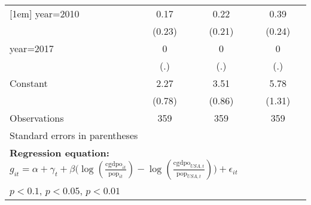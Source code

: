 \begin{sidewaystable}[htbp]
\begin{tabular}{l*{3}{c}}
[1em]
year=2010       &     0.17         &     0.22         &     0.39         \\
                &   (0.23)         &   (0.21)         &   (0.24)         \\
[1em]
year=2017       &        0         &        0         &        0         \\
                &      (.)         &      (.)         &      (.)         \\
[1em]
Constant        &     2.27\sym{***}&     3.51\sym{***}&     5.78\sym{***}\\
                &   (0.78)         &   (0.86)         &   (1.31)         \\
\hline
Observations    &      359         &      359         &      359         \\
\hline\hline
\multicolumn{4}{l}{\footnotesize Standard errors in parentheses}\\
\multicolumn{4}{l}{\footnotesize \textbf{Regression equation:} \(g_{it} = \alpha + \gamma_t + \beta \big(\log (\frac{\textrm{cgdpo}_{it}}{\textrm{pop}_{it}} ) - \log (\frac{\textrm{cgdpo}_{USA,t}}{\textrm{pop}_{USA,t}}  ) \big) + \epsilon_{it}\)}\\
\multicolumn{4}{l}{\footnotesize \sym{*} \(p<0.1\), \sym{**} \(p<0.05\), \sym{***} \(p<0.01\)}\\
\end{tabular}
\end{sidewaystable}
